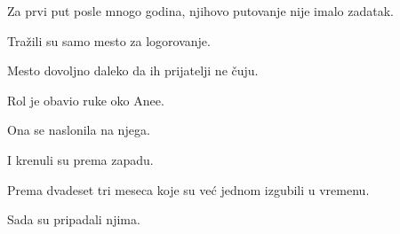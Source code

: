 \bigskip

Za prvi put posle mnogo godina, njihovo putovanje nije imalo zadatak.

\bigskip

Tražili su samo mesto za logorovanje.

\bigskip

Mesto dovoljno daleko da ih prijatelji ne čuju.

\bigskip

Rol je obavio ruke oko Anee.

\bigskip

Ona se naslonila na njega.

\bigskip

I krenuli su prema zapadu.

\bigskip

Prema dvadeset tri meseca koje su već jednom izgubili u vremenu.

\bigskip

Sada su pripadali njima.
